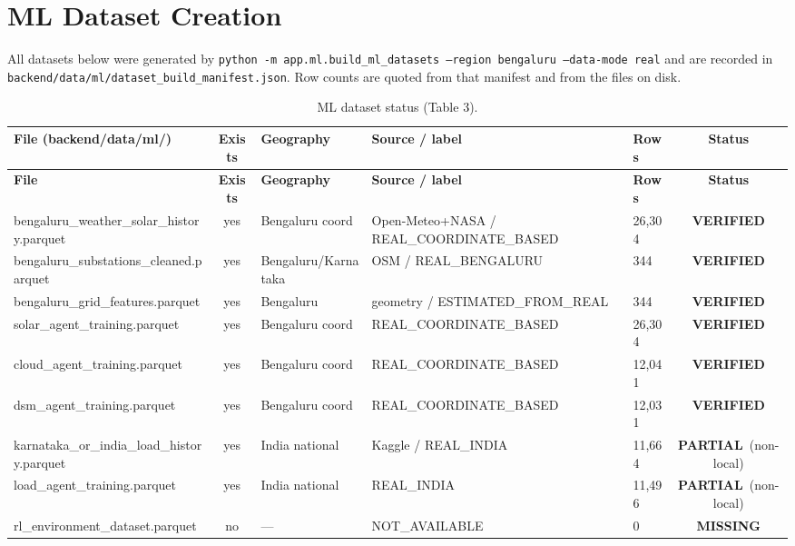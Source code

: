 \documentclass[11pt,a4paper]{article}
\newcommand{\stV}{\textcolor{cok}{\textbf{VERIFIED}}}
\newcommand{\stP}{\textcolor{cpart}{\textbf{PARTIAL}}}
\newcommand{\stM}{\textcolor{cmiss}{\textbf{MISSING}}}
\newcommand{\yes}{\textcolor{cok}{yes}}
\newcommand{\no}{\textcolor{cmiss}{no}}
\newcommand{\code}[1]{\texttt{\small #1}}
\begin{document}
\section{ML Dataset Creation}
All datasets below were generated by
\code{python -m app.ml.build\_ml\_datasets --region bengaluru --data-mode real} and are
recorded in \code{backend/data/ml/dataset\_build\_manifest.json}. Row counts are quoted
from that manifest and from the files on disk.

\begin{footnotesize}
\begin{longtable}{@{}p{4.0cm}c p{2.3cm}p{2.6cm}p{1.4cm}c@{}}
\caption{ML dataset status (Table 3).}\label{tab:mldata}\\
\toprule
\textbf{File (backend/data/ml/)} & \textbf{Exists} & \textbf{Geography} & \textbf{Source / label} & \textbf{Rows} & \textbf{Status}\\
\midrule
\endfirsthead
\toprule
\textbf{File} & \textbf{Exists} & \textbf{Geography} & \textbf{Source / label} & \textbf{Rows} & \textbf{Status}\\
\midrule
\endhead
\bottomrule
\endfoot
bengaluru\_weather\_solar\_history.parquet & \yes & Bengaluru coord & Open-Meteo+NASA / REAL\_COORDINATE\_BASED & 26{,}304 & \stV\\
bengaluru\_substations\_cleaned.parquet & \yes & Bengaluru/Karnataka & OSM / REAL\_BENGALURU & 344 & \stV\\
bengaluru\_grid\_features.parquet & \yes & Bengaluru & geometry / ESTIMATED\_FROM\_REAL & 344 & \stV\\
solar\_agent\_training.parquet & \yes & Bengaluru coord & REAL\_COORDINATE\_BASED & 26{,}304 & \stV\\
cloud\_agent\_training.parquet & \yes & Bengaluru coord & REAL\_COORDINATE\_BASED & 12{,}041 & \stV\\
dsm\_agent\_training.parquet & \yes & Bengaluru coord & REAL\_COORDINATE\_BASED & 12{,}031 & \stV\\
karnataka\_or\_india\_load\_history.parquet & \yes & India national & Kaggle / REAL\_INDIA & 11{,}664 & \stP\ (non-local)\\
load\_agent\_training.parquet & \yes & India national & REAL\_INDIA & 11{,}496 & \stP\ (non-local)\\
rl\_environment\_dataset.parquet & \no & --- & NOT\_AVAILABLE & 0 & \stM\\
\end{longtable}
\end{footnotesize}
\end{document}
